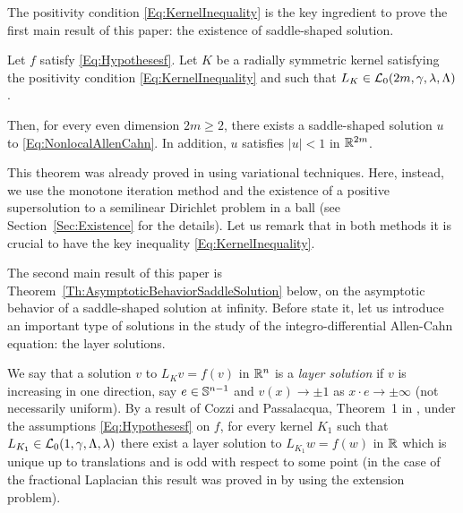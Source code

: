 The positivity condition \eqref{Eq:KernelInequality} is the key ingredient to prove the first main result of this paper: the existence of saddle-shaped solution.


\begin{theorem}
	\label{Th:Existence}
	Let $f$ satisfy \eqref{Eq:Hypothesesf}. Let $K$ be a radially symmetric kernel satisfying the positivity condition \eqref{Eq:KernelInequality} and such that $L_K\in \mathcal{L}_0(2m, \gamma, \lambda, \Lambda)$. 
	
	Then, for every even dimension $2m \geq 2$, there exists a saddle-shaped solution $u$ to \eqref{Eq:NonlocalAllenCahn}. In addition, $u$ satisfies $|u|<1$ in $\mathbb{R}^{2m}$.
\end{theorem}



This theorem was already proved in \cite{FelipeSanz-Perela:IntegroDifferentialI} using variational techniques. Here, instead, we use the monotone iteration method and the existence of a positive supersolution to a semilinear Dirichlet problem in a ball (see Section~\ref{Sec:Existence} for the details). Let us remark that in both methods it is crucial to have the key inequality \eqref{Eq:KernelInequality}.


The second main result of this paper is Theorem~\ref{Th:AsymptoticBehaviorSaddleSolution} below, on the asymptotic behavior of a saddle-shaped solution at infinity. Before state it, let us introduce an important type of solutions in the study of the integro-differential Allen-Cahn equation: the layer solutions.


We say that a solution $v$ to $L_K v = f(v)$ in $\mathbb{R}^n$ is a \emph{layer solution} if $v$ is increasing in one direction, say $e\in \mathbb{S}^{n-1}$ and $v(x) \to \pm 1$ as $x\cdot e \to \pm \infty$ (not necessarily uniform). By a result of Cozzi and Passalacqua, Theorem~1 in \cite{CozziPassalacqua}, under the assumptions \eqref{Eq:Hypothesesf} on $f$, for every kernel $K_1$ such that $L_{K_1}\in \mathcal{L}_0(1,\gamma,\Lambda, \lambda)$ there exist a layer solution  to $L_{K_1} w = f(w)$ in $\mathbb{R}$ which is unique up to translations and is odd with respect to some point (in the case of the fractional Laplacian this result was proved in \cite{CabreSolaMorales,CabreSireII} by using the extension problem).

